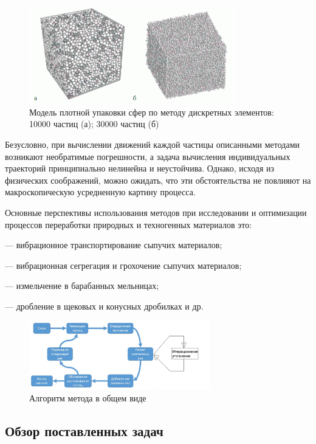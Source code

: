 \documentclass[utf8x, 14pt, oneside, a4paper]{article}
\begin{document}
\begin{figure}[H]
	\centering
	\includegraphics[width=0.8\textwidth]{primer}
	\caption{Модель плотной упаковки сфер по методу дискретных элементов: 10000 частиц (а); 30000 частиц (б)}
\end{figure} 

Безусловно, при вычислении движений каждой частицы описанными методами возникают необратимые погрешности, а задача вычисления индивидуальных траекторий принципиально нелинейна и неустойчива.
Однако, исходя из физических соображений, можно ожидать, что эти обстоятельства не повлияют на макроскопическую усредненную картину процесса. 

Основные перспективы использования методов при исследовании и оптимизации процессов переработки природных и техногенных материалов это:

--- вибрационное транспортирование сыпучих материалов;

--- вибрационная сегрегация и грохочение сыпучих материалов;

--- измельчение в барабанных мельницах;

--- дробление в щековых и конусных дробилках и др.

\begin{figure}[H]
	\centering
	\includegraphics[width=0.7\textwidth]{algorithm}
	\caption{Алгоритм метода в общем виде}
	\label{pic:algo}
\end{figure} 

\subsection*{Обзор поставленных задач}
\end{document}
